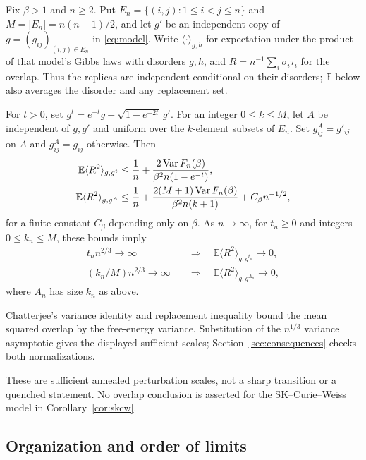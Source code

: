 \begin{corollary}
\label{cor:disorder-chaos}
Fix $\beta>1$ and $n\ge2$. Put $E_n=\{(i,j):1\le i<j\le n\}$ and
$M=|E_n|=n(n-1)/2$, and let $g'$ be an independent copy of
$g=(g_{ij})_{(i,j)\in E_n}$ in \eqref{eq:model}. Write
$\langle\cdot\rangle_{g,h}$ for expectation under the product of that
model's Gibbs laws with disorders $g,h$, and
$R=n^{-1}\sum_i\sigma_i\tau_i$ for the overlap. Thus the replicas are
independent conditional on their disorders; $\mathbb E$ below also
averages the disorder and any replacement set.

For $t>0$, set $g^t=e^{-t}g+\sqrt{1-e^{-2t}}\,g'$. For an integer
$0\le k\le M$, let $A$ be independent of $g,g'$ and uniform over the
$k$-element subsets of $E_n$. Set $g^A_{ij}=g'_{ij}$ on $A$ and
$g^A_{ij}=g_{ij}$ otherwise. Then
\begin{align}
 \mathbb E\langle R^2\rangle_{g,g^t}
 &\le \frac1n+\frac{2\operatorname{Var} F_n(\beta)}
                 {\beta^2n(1-e^{-t})},\label{eq:chaos-ou}\\
 \mathbb E\langle R^2\rangle_{g,g^A}
 &\le \frac1n+\frac{2(M+1)\operatorname{Var} F_n(\beta)}
                 {\beta^2n(k+1)}+C_\beta n^{-1/2},\label{eq:chaos-replacement}
\end{align}
for a finite constant $C_\beta$ depending only on $\beta$. As $n\to\infty$, for
$t_n\ge0$ and integers $0\le k_n\le M$, these bounds imply
\[
 \begin{aligned}
 t_n n^{2/3}\to\infty
 &\quad\Longrightarrow\quad
 \mathbb E\langle R^2\rangle_{g,g^{t_n}}\to0,\\
 (k_n/M)n^{2/3}\to\infty
 &\quad\Longrightarrow\quad
 \mathbb E\langle R^2\rangle_{g,g^{A_n}}\to0,
 \end{aligned}
\]
where $A_n$ has size $k_n$ as above.
\end{corollary}

Chatterjee's variance identity and replacement inequality bound the
mean squared overlap by the free-energy variance. Substitution of the
$n^{1/3}$ variance asymptotic gives the displayed sufficient scales;
Section~\ref{sec:consequences} checks both normalizations.

These are sufficient annealed perturbation scales, not a sharp
transition or a quenched statement. No overlap conclusion is asserted
for the SK--Curie--Weiss model in Corollary~\ref{cor:skcw}.

\subsection{Organization and order of limits}

